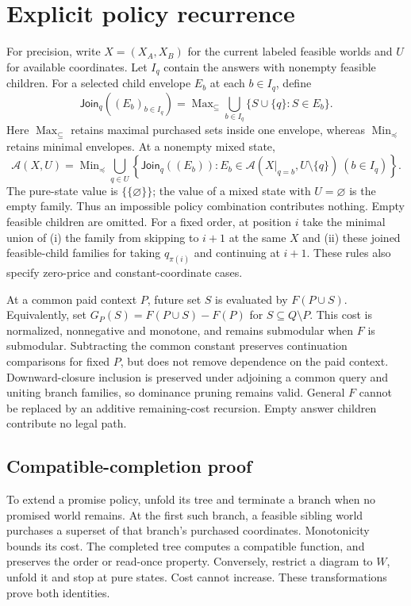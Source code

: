\documentclass[pdflatex,sn-mathphys-num]{sn-jnl}
\DeclareMathOperator{\Max}{Max}
\DeclareMathOperator{\Min}{Min}
\theoremstyle{thmstyleone}
\theoremstyle{thmstylethree}
\theoremstyle{thmstyletwo}
\begin{document}
\section{Explicit policy recurrence}\label{app:recursion}
For precision, write $X=(X_A,X_B)$ for the current labeled feasible worlds and $U$ for available coordinates. Let $I_q$ contain the answers with nonempty feasible children. For a selected child envelope $E_b$ at each $b\in I_q$, define
\[
 \mathsf{Join}_q((E_b)_{b\in I_q})
 =\Max_{\subseteq}\!\bigcup_{b\in I_q}\{S\cup\{q\}:S\in E_b\}.
\]
Here $\Max_{\subseteq}$ retains maximal purchased sets inside one envelope, whereas $\Min_{\preceq}$ retains minimal envelopes. At a nonempty mixed state,
\[
 \mathcal A(X,U)=\Min_{\preceq}\!\bigcup_{q\in U}
 \left\{\mathsf{Join}_q((E_b)):
 E_b\in\mathcal A(X|_{q=b},U\setminus\{q\})\ (b\in I_q)\right\}.
\]
The pure-state value is $\{\{\varnothing\}\}$; the value of a mixed state with $U=\varnothing$ is the empty family. Thus an impossible policy combination contributes nothing. Empty feasible children are omitted. For a fixed order, at position $i$ take the minimal union of (i) the family from skipping to $i+1$ at the same $X$ and (ii) these joined feasible-child families for taking $q_{\pi(i)}$ and continuing at $i+1$. These rules also specify zero-price and constant-coordinate cases.

At a common paid context $P$, future set $S$ is evaluated by $F(P\cup S)$. Equivalently, set $G_P(S)=F(P\cup S)-F(P)$ for $S\subseteq Q\setminus P$. This cost is normalized, nonnegative and monotone, and remains submodular when $F$ is submodular. Subtracting the common constant preserves continuation comparisons for fixed $P$, but does not remove dependence on the paid context. Downward-closure inclusion is preserved under adjoining a common query and uniting branch families, so dominance pruning remains valid. General $F$ cannot be replaced by an additive remaining-cost recursion. Empty answer children contribute no legal path.

\subsection{Compatible-completion proof}\label{app:completion}
To extend a promise policy, unfold its tree and terminate a branch when no promised world remains. At the first such branch, a feasible sibling world purchases a superset of that branch's purchased coordinates. Monotonicity bounds its cost. The completed tree computes a compatible function, and preserves the order or read-once property. Conversely, restrict a diagram to $W$, unfold it and stop at pure states. Cost cannot increase. These transformations prove both identities.
\end{document}

